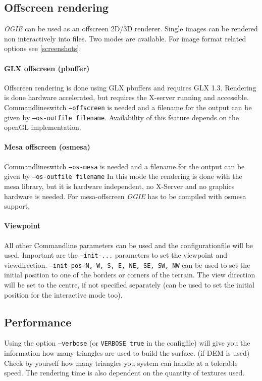 \subsection{Offscreen rendering}

\emph{OGIE} can be used as an offscreen 2D/3D renderer. 
Single images can be rendered non interactively into files. Two modes are available. For image format related options see \ref{screenshots}.

\paragraph{GLX offscreen (pbuffer)}
Offscreen rendering is done using GLX pbuffers and requires GLX 1.3. Rendering is done hardware accelerated, but requires the X-server running and accessible.
Commandlineswitch \texttt{--offscreen} is needed and
a filename for the output can be given by \texttt{--os-outfile filename}.
Availability of this feature depends on the openGL implementation.


\paragraph{Mesa offscreen (osmesa)}
Commandlineswitch \texttt{--os-mesa} is needed and
a filename for the output can be given by \texttt{--os-outfile filename}
In this mode the rendering is done with the mesa library, but it is hardware independent, no X-Server and no graphics hardware is needed.
For mesa-offscreen \emph{OGIE} has to be compiled with osmesa support.

\paragraph{Viewpoint}
All other Commandline parameters can be used and the configurationfile will be used.
Important are the \texttt{--init-...} parameters to set the viewpoint and viewdirection.
\texttt{--init-pos-N, W, S, E, NE, SE, SW, NW}  can be used to set the initial position to one
of the borders or corners of the terrain. The view direction will be set to the
centre, if not specified separately (can be used to set the initial position for
the interactive mode too).


\subsection{Performance}

Using the option \texttt{--verbose} (or \texttt{VERBOSE true}  in the configfile) will give you
the information how many triangles are used to build the surface. (if DEM is
used) Check by yourself how many triangles you system can handle at a tolerable
speed. The rendering time is also dependent on the quantity of textures used.

